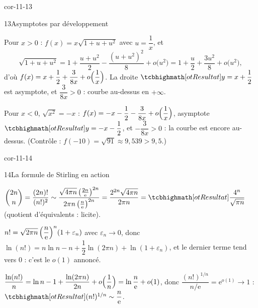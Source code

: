 \begin{blocLivre}{cor-11-13}
\begin{corrige}{13}{Asymptotes par développement}
\begin{questions}
  \item Pour $x>0$ :
    $f(x)=x\sqrt{1+u+u^{2}}$ avec $u=\dfrac1x$, et
    \[
    \sqrt{1+u+u^{2}}=1+\frac{u+u^{2}}{2}-\frac{(u+u^{2})^{2}}{8}+o\bigl(u^{2}\bigr)
    =1+\frac{u}{2}+\frac{3u^{2}}{8}+o\bigl(u^{2}\bigr),
    \]
    d'où $f(x)=x+\dfrac12+\dfrac{3}{8x}+o\Bigl(\dfrac1x\Bigr)$. La droite
    $\res{y=x+\dfrac12}$ est asymptote, et $\dfrac{3}{8x}>0$ : courbe
    au-dessus en $+\infty$.
  \item Pour $x<0$, $\sqrt{x^{2}}=-x$ :
    $f(x)=-x-\dfrac12-\dfrac{3}{8x}+o\Bigl(\dfrac1x\Bigr)$, asymptote
    $\res{y=-x-\dfrac12}$, et $-\dfrac{3}{8x}>0$ : la courbe est encore
    au-dessus. (Contrôle : $f(-10)=\sqrt{91}\approx9{,}539>9{,}5$.)
\end{questions}
\end{corrige}
\end{blocLivre}

\begin{blocLivre}{cor-11-14}
\begin{corrige}{14}{La formule de Stirling en action}
\begin{questions}
  \item $\displaystyle\binom{2n}{n}=\frac{(2n)!}{(n!)^{2}}
    \sim\frac{\sqrt{4\pi n}\,\bigl(\frac{2n}{\mathrm{e}}\bigr)^{2n}}
    {2\pi n\,\bigl(\frac{n}{\mathrm{e}}\bigr)^{2n}}
    =\frac{2^{2n}\sqrt{4\pi n}}{2\pi n}
    =\res{\frac{4^{n}}{\sqrt{\pi n}}}$ (quotient d'équivalents : licite).
  \item $n!=\sqrt{2\pi n}\,\Bigl(\dfrac{n}{\mathrm{e}}\Bigr)^{n}(1+\varepsilon_n)$
    avec $\varepsilon_n\to0$, donc
    $\ln(n!)=n\ln n-n+\dfrac12\ln(2\pi n)+\ln(1+\varepsilon_n)$, et le
    dernier terme tend vers $0$ : c'est le $o(1)$ annoncé.
  \item $\dfrac{\ln(n!)}{n}=\ln n-1+\dfrac{\ln(2\pi n)}{2n}+o\Bigl(\dfrac1n\Bigr)
    =\ln\dfrac{n}{\mathrm{e}}+o(1)$, donc
    $\dfrac{(n!)^{1/n}}{n/\mathrm{e}}=\mathrm{e}^{o(1)}\to1$ :
    $\res{(n!)^{1/n}\sim\dfrac{n}{\mathrm{e}}}$.
\end{questions}
\end{corrige}
\end{blocLivre}

